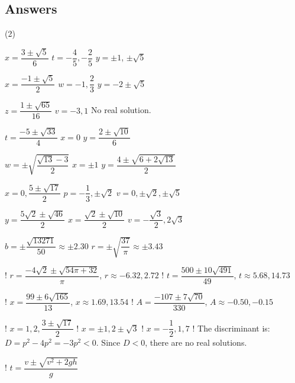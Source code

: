 \clearpage

\subsection{Answers}

\begin{tasks}(2)

\task  $x = \dfrac{3 \pm \sqrt{5}}{6}$ 
\task  $t = -\dfrac{4}{5}, -\dfrac{2}{5}$ 
\task  $y = \pm 1$, $\pm \sqrt{5}$ 


\task $x = \dfrac{-1 \pm \sqrt{5}}{2}$
\task $w = -1, \dfrac{2}{3}$ 
\task $y = -2 \pm \sqrt{5}$


\task $z = \dfrac{1 \pm \sqrt{65}}{16}$
\task  $v = -3, 1$
\task No real solution.


\task $t = \dfrac{-5 \pm \sqrt{33}}{4}$
\task $x = 0$ 
\task $y = \dfrac{2 \pm \sqrt{10}}{6}$

\task $w = \pm \sqrt{\dfrac{\sqrt{13} - 3}{2}}$
\task $x = \pm 1$
\task $y = \dfrac{4 \pm \sqrt{6 + 2 \sqrt{13}}}{2}$

\task $x = 0, \dfrac{5 \pm \sqrt{17}}{2}$
\task $p = -\dfrac{1}{3}, \pm \sqrt{2}$ 
\task $v = 0, \pm \sqrt{2}, \pm \sqrt{5}$


\task $y = \dfrac{5\sqrt{2} \pm \sqrt{46}}{2}$
\task $x = \dfrac{\sqrt{2} \pm \sqrt{10}}{2}$
\task $v = -\dfrac{\sqrt{3}}{2}, 2\sqrt{3}$


\task $b = \pm \dfrac{\sqrt{13271}}{50} \approx \pm 2.30$
\task $r = \pm \sqrt{\dfrac{37}{\pi}} \approx \pm 3.43$ 

\task! $r = \dfrac{-4\sqrt{2} \pm \sqrt{54\pi + 32}}{\pi}$, $r \approx -6.32, 2.72$
\task! $t = \dfrac{500 \pm 10\sqrt{491}}{49}$, $t \approx 5.68, 14.73$

\task! $x = \dfrac{99 \pm 6 \sqrt{165}}{13}$, $x \approx 1.69, 13.54$
\task! $A = \dfrac{-107 \pm 7 \sqrt{70}}{330}$, $A \approx -0.50, -0.15$

\task! $x = 1, 2, \dfrac{3 \pm \sqrt{17}}{2}$
\task! $x = \pm 1, 2 \pm \sqrt{3}$ 
\task! $x = -\dfrac{1}{2}, 1, 7$
\task! The discriminant is: $D = p^2 - 4p^2 = -3p^2 < 0$.  Since $D < 0$, there are no real solutions.  

\task! $t = \dfrac{v \pm \sqrt{v^2 + 2gh}}{g}$

\end{tasks}
